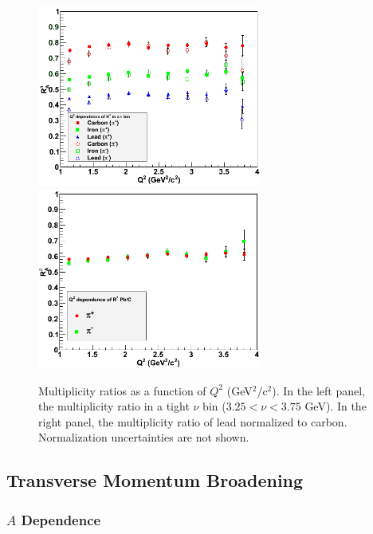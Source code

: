 \begin{figure}[tbp]
\centering
\includegraphics[width=7.4cm] {chap6-fig/F_RvQ2inNu.png} 
\includegraphics[width=7.4cm] {chap6-fig/F_RvQ2_PbC.png} 
\caption {Multiplicity ratios as a function of $Q^2$ (GeV$^2$/c$^2$). In the left panel,
the multiplicity ratio in a tight $\nu$ bin ($3.25 < \nu < 3.75$ GeV). In the right 
panel, the multiplicity ratio of lead normalized to carbon. Normalization 
uncertainties are not shown.}
\label{fig:RQ2Detailed}
\end{figure}

\subsection{Transverse Momentum Broadening}

\subsubsection{$A$ Dependence}

